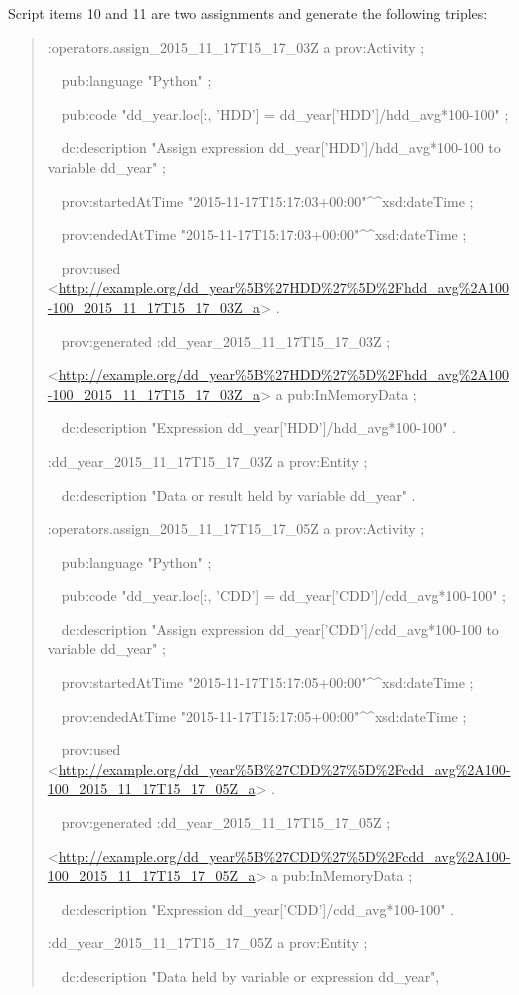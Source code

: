 Script items 10 and 11 are two assignments and generate the following triples:
\begin{quotation}
	\noindent:operators.assign\_2015\_11\_17T15\_17\_03Z a prov:Activity ;
	
	\noindent\ \ pub:language "Python" ;
	
	\noindent\ \ pub:code "dd\_year.loc[:, 'HDD'] = dd\_year['HDD']/hdd\_avg*100-100" ;
	
	\noindent\ \ dc:description "Assign expression dd\_year['HDD']/hdd\_avg*100-100 to variable dd\_year" ;
	
	\noindent\ \ prov:startedAtTime "2015-11-17T15:17:03+00:00"\^{}\^{}xsd:dateTime ;
	
	\noindent\ \ prov:endedAtTime "2015-11-17T15:17:03+00:00"\^{}\^{}xsd:dateTime ;
	
	\noindent\ \ prov:used <\url{http://example.org/dd_year%5B%27HDD%27%5D%2Fhdd_avg%2A100-100_2015_11_17T15_17_03Z_a}> .
		
	\noindent\ \ prov:generated :dd\_year\_2015\_11\_17T15\_17\_03Z ;
	
	\noindent<\url{http://example.org/dd_year%5B%27HDD%27%5D%2Fhdd_avg%2A100-100_2015_11_17T15_17_03Z_a}> a pub:InMemoryData ;
	
	\noindent\ \ dc:description "Expression dd\_year['HDD']/hdd\_avg*100-100" .
	
	\noindent:dd\_year\_2015\_11\_17T15\_17\_03Z a prov:Entity ;
	
	\noindent\ \ dc:description "Data or result held by variable dd\_year" .
	
	\noindent:operators.assign\_2015\_11\_17T15\_17\_05Z a prov:Activity ;
	
	\noindent\ \ pub:language "Python" ;
	
	\noindent\ \ pub:code "dd\_year.loc[:, 'CDD'] = dd\_year['CDD']/cdd\_avg*100-100" ;
	
	\noindent\ \ dc:description "Assign expression dd\_year['CDD']/cdd\_avg*100-100 to variable dd\_year" ;
	
	\noindent\ \ prov:startedAtTime "2015-11-17T15:17:05+00:00"\^{}\^{}xsd:dateTime ;
	
	\noindent\ \ prov:endedAtTime "2015-11-17T15:17:05+00:00"\^{}\^{}xsd:dateTime ;
	
	\noindent\ \ prov:used <\url{http://example.org/dd_year%5B%27CDD%27%5D%2Fcdd_avg%2A100-100_2015_11_17T15_17_05Z_a}> .
		
	\noindent\ \ prov:generated :dd\_year\_2015\_11\_17T15\_17\_05Z ;
	
	\noindent<\url{http://example.org/dd_year%5B%27CDD%27%5D%2Fcdd_avg%2A100-100_2015_11_17T15_17_05Z_a}> a pub:InMemoryData ;
	
	\noindent\ \ dc:description "Expression dd\_year['CDD']/cdd\_avg*100-100" .

	\noindent:dd\_year\_2015\_11\_17T15\_17\_05Z a prov:Entity ;
	
	\noindent\ \ dc:description "Data held by variable or expression dd\_year",
\end{quotation}

